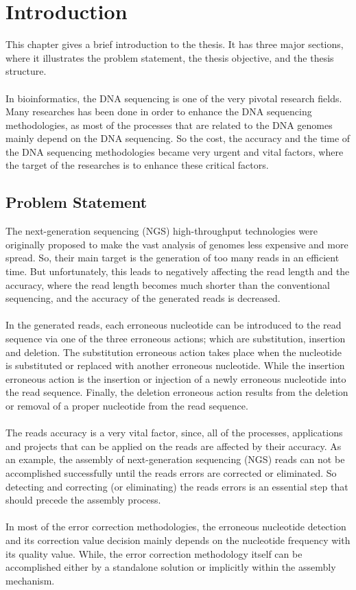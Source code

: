 \documentclass[12pt,openany]{llncs}
\begin{document}
\chapter{\label{chap:1} Introduction}
This chapter gives a brief introduction to the thesis. It has three major sections, where it illustrates the problem statement, the thesis objective, and the thesis structure.
\\
\\
In bioinformatics, the DNA sequencing is one of the very pivotal research fields. Many researches has been done in order to enhance the DNA sequencing methodologies, as most of the processes that are related to the DNA genomes mainly depend on the DNA sequencing. So the cost, the accuracy and the time of the DNA sequencing methodologies became very urgent and vital factors, where the target of the researches is to enhance these critical factors.
\section{Problem Statement}
The next-generation sequencing (NGS) high-throughput technologies \cite{NGS} were originally proposed to make the vast analysis of genomes less expensive and more spread. So, their main target is the generation of too many reads in an efficient time. But unfortunately, this leads to negatively affecting the read length and the accuracy, where the read length becomes much shorter than the conventional sequencing, and the accuracy of the generated reads is decreased. 
\\
\\
In the generated reads, each erroneous nucleotide can be introduced to the read sequence via one of the three erroneous actions; which are substitution, insertion and deletion. 
The substitution erroneous action takes place when the nucleotide is substituted or replaced with another erroneous nucleotide. While the insertion erroneous action is the insertion or injection of a newly erroneous nucleotide into the read sequence. Finally, the deletion erroneous action results from the deletion or removal of a proper nucleotide from the read sequence.
\\
\\
The reads accuracy is a very vital factor, since, all of the processes, applications and projects that can be applied on the reads are affected by their accuracy. As an example, the assembly of next-generation sequencing (NGS) reads can not be accomplished successfully until the reads errors are corrected or eliminated. So detecting and correcting (or eliminating) the reads errors is an essential step that should precede the assembly process. 
\\
\\
In most of the error correction methodologies, the erroneous nucleotide detection and its correction value decision mainly depends on the nucleotide frequency with its quality value\cite{ErrCorr}. While, the error correction methodology itself can be accomplished either by a standalone solution or implicitly within the assembly mechanism. 
\end{document}
